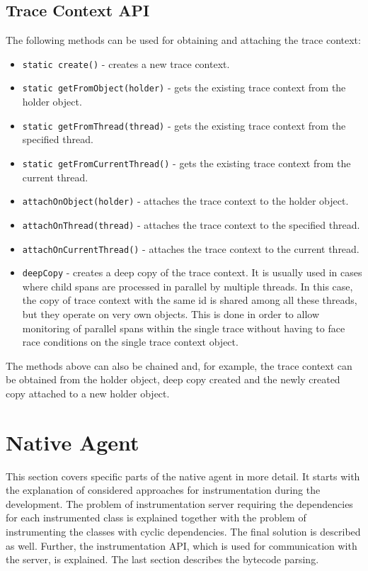 \subsection{Trace Context API}
\label{imp:trace_context_api}
The following methods can be used for obtaining and attaching the trace context:
\begin{itemize}
	\item \texttt{static create()} - creates a new trace context.
	\item \texttt{static getFromObject(holder)} - gets the existing trace context from the holder object.
	\item \texttt{static getFromThread(thread)} - gets the existing trace context from the specified thread.
	\item \texttt{static getFromCurrentThread()} -  gets the existing trace context from the current thread.
	\item \texttt{attachOnObject(holder)} - attaches the trace context to the holder object.
	\item \texttt{attachOnThread(thread)} - attaches the trace context to the specified \newline thread.
	\item \texttt{attachOnCurrentThread()} - attaches the trace context to the current \newline thread.
	\item \texttt{deepCopy} - creates a deep copy of the trace context. It is usually used in cases where child spans are processed in parallel by multiple threads. In this case, the copy of trace context with the same id is shared among all these threads, but they operate on very own objects. This is done in order to allow monitoring of parallel spans within the single trace without having to face race conditions on the single trace context object.
\end{itemize}

The methods above can also be chained and, for example, the trace context can be obtained from the holder object, deep copy created and the newly created copy attached to a new holder object.


\section{Native Agent}
This section covers specific parts of the native agent in more detail. It starts with the explanation of considered approaches for instrumentation during the development. The problem of instrumentation server requiring the dependencies for each instrumented class is explained together with the problem of instrumenting the classes with cyclic dependencies. The final solution is described as well. Further, the instrumentation API, which is used for communication with the server, is explained. The last section describes the bytecode parsing.
